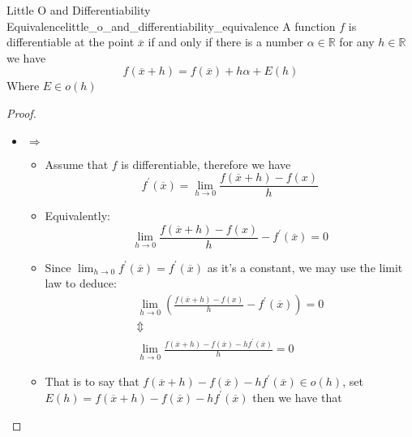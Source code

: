 \begin{proposition}{Little O and Differentiability
Equivalence}{little_o_and_differentiability_equivalence}
  A function $f$ is differentiable at the point $\overline{x}$ if and only if
  there is a number $ \alpha \in \mathbb{R}$ for any $h \in \mathbb{R}$ we have 
  \[
  f\left(\overline{x}  +  h\right) = f\left(\overline{x}\right)  +  h \alpha  +  E\left(h\right)
  \]
  Where $E \in o\left(h\right) $ 
\end{proposition}
\begin{proof}
    \begin{itemize}
      \item $\Rightarrow$ 
        \begin{itemize}
          \item Assume that $f$ is differentiable, therefore we have
              \[
              f ^{ \prime } \left( \overline{x} \right) =  \lim_{ h \to 0 }
              \frac{f\left( \overline{x} +  h \right) -  f\left( x \right) }{h}
              \]
            \item Equivalently:
              \[
               \lim_{ h \to 0 } \frac{f\left( \overline{x} +  h \right) -
               f\left( x \right) }{h} -  f ^{ \prime } \left( \overline{x}
               \right) = 0
              \]
            \item Since $ \lim_{ h \to 0 } f ^{ \prime } \left( \overline{x}
            \right) = f ^{ \prime } \left( \overline{x} \right)  $ as it's a
            constant, we may use the limit law to deduce:
            \begin{gather*}
                \lim_{ h \to 0 } \left( \frac{f\left( \overline{x} + h \right) -
                f\left( x \right) }{h} - f ^{ \prime } \left( \overline{x}
                \right) \right) = 0 \\
                \Updownarrow \\
                \lim_{ h \to 0 } \frac{f\left( \overline{x} + h \right) -
                f\left( \overline{x} \right) - h f ^{ \prime } \left(
                \overline{x} \right) }{h}= 0
            \end{gather*}
            \item That is to say that $ f\left( \overline{x} + h \right) -
            f\left( \overline{x} \right) - h f ^{ \prime } \left( \overline{x}
            \right) \in o\left( h \right)  $, set $ E\left( h \right) = f\left(
            \overline{x} + h \right) - f\left( \overline{x} \right) - h f ^{
            \prime } \left( \overline{x} \right)  $ then we have that

\end{itemize}
\end{itemize}
\end{proof}
